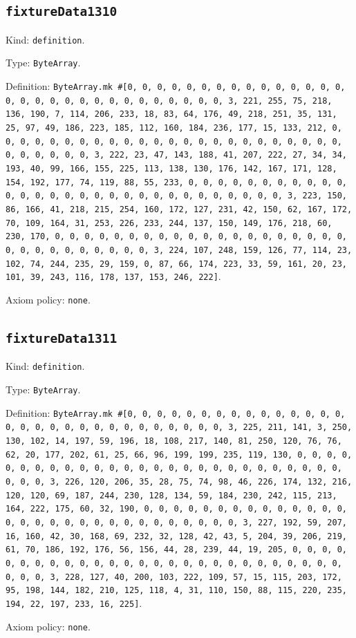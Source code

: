 \documentclass[11pt]{article}
\begin{document}
\subsection*{\texttt{fixtureData1310}}
\noindent Kind: \texttt{definition}.\par
\noindent Type: \texttt{ByteArray}.\par
\noindent Definition: \texttt{ByteArray.mk \#[0, 0, 0, 0, 0, 0, 0, 0, 0, 0, 0, 0, 0, 0, 0, 0, 0, 0, 0, 0, 0, 0, 0, 0, 0, 0, 0, 0, 0, 0, 3, 221, 255, 75, 218, 136, 190, 7, 114, 206, 233, 18, 83, 64, 176, 49, 218, 251, 35, 131, 25, 97, 49, 186, 223, 185, 112, 160, 184, 236, 177, 15, 133, 212, 0, 0, 0, 0, 0, 0, 0, 0, 0, 0, 0, 0, 0, 0, 0, 0, 0, 0, 0, 0, 0, 0, 0, 0, 0, 0, 0, 0, 0, 0, 3, 222, 23, 47, 143, 188, 41, 207, 222, 27, 34, 34, 193, 40, 99, 166, 155, 225, 113, 138, 130, 176, 142, 167, 171, 128, 154, 192, 177, 74, 119, 88, 55, 233, 0, 0, 0, 0, 0, 0, 0, 0, 0, 0, 0, 0, 0, 0, 0, 0, 0, 0, 0, 0, 0, 0, 0, 0, 0, 0, 0, 0, 0, 0, 3, 223, 150, 86, 166, 41, 218, 215, 254, 160, 172, 127, 231, 42, 150, 62, 167, 172, 70, 109, 164, 31, 253, 226, 233, 244, 137, 150, 149, 176, 218, 60, 230, 170, 0, 0, 0, 0, 0, 0, 0, 0, 0, 0, 0, 0, 0, 0, 0, 0, 0, 0, 0, 0, 0, 0, 0, 0, 0, 0, 0, 0, 0, 0, 3, 224, 107, 248, 159, 126, 77, 114, 23, 102, 74, 244, 235, 29, 159, 0, 87, 66, 174, 223, 33, 59, 161, 20, 23, 101, 39, 243, 116, 178, 137, 153, 246, 222]}.\par
\noindent Axiom policy: \texttt{none}.\par
\subsection*{\texttt{fixtureData1311}}
\noindent Kind: \texttt{definition}.\par
\noindent Type: \texttt{ByteArray}.\par
\noindent Definition: \texttt{ByteArray.mk \#[0, 0, 0, 0, 0, 0, 0, 0, 0, 0, 0, 0, 0, 0, 0, 0, 0, 0, 0, 0, 0, 0, 0, 0, 0, 0, 0, 0, 0, 0, 3, 225, 211, 141, 3, 250, 130, 102, 14, 197, 59, 196, 18, 108, 217, 140, 81, 250, 120, 76, 76, 62, 20, 177, 202, 61, 25, 66, 96, 199, 199, 235, 119, 130, 0, 0, 0, 0, 0, 0, 0, 0, 0, 0, 0, 0, 0, 0, 0, 0, 0, 0, 0, 0, 0, 0, 0, 0, 0, 0, 0, 0, 0, 0, 3, 226, 120, 206, 35, 28, 75, 74, 98, 46, 226, 174, 132, 216, 120, 120, 69, 187, 244, 230, 128, 134, 59, 184, 230, 242, 115, 213, 164, 222, 175, 60, 32, 190, 0, 0, 0, 0, 0, 0, 0, 0, 0, 0, 0, 0, 0, 0, 0, 0, 0, 0, 0, 0, 0, 0, 0, 0, 0, 0, 0, 0, 0, 0, 3, 227, 192, 59, 207, 16, 160, 42, 30, 168, 69, 232, 32, 128, 42, 43, 5, 204, 39, 206, 219, 61, 70, 186, 192, 176, 56, 156, 44, 28, 239, 44, 19, 205, 0, 0, 0, 0, 0, 0, 0, 0, 0, 0, 0, 0, 0, 0, 0, 0, 0, 0, 0, 0, 0, 0, 0, 0, 0, 0, 0, 0, 0, 0, 3, 228, 127, 40, 200, 103, 222, 109, 57, 15, 115, 203, 172, 95, 198, 144, 182, 210, 125, 118, 4, 31, 110, 150, 88, 115, 220, 235, 194, 22, 197, 233, 16, 225]}.\par
\noindent Axiom policy: \texttt{none}.\par
\end{document}
